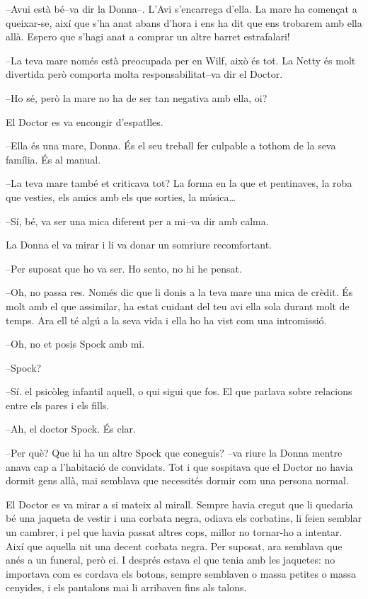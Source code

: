 --Avui està bé--va dir la Donna--. L'Avi s'encarrega d'ella. La mare ha
començat a queixar-se, així que s'ha anat abans d'hora i ens ha dit que
ens trobarem amb ella allà. Espero que s'hagi anat a comprar un altre
barret estrafalari!

--La teva mare només està preocupada per en Wilf, això és tot. La Netty
és molt divertida però comporta molta responsabilitat--va dir el Doctor.

--Ho sé, però la mare no ha de ser tan negativa amb ella, oi?

El Doctor es va encongir d'espatlles.

--Ella és una mare, Donna. És el seu treball fer culpable a tothom de la
seva família. És al manual.

--La teva mare també et criticava tot? La forma en la que et pentinaves,
la roba que vesties, els amics amb els que sorties, la música\ldots{}

--Sí, bé, va ser una mica diferent per a mi--va dir amb calma.

La Donna el va mirar i li va donar un somriure recomfortant.

--Per suposat que ho va ser. Ho sento, no hi he pensat.

--Oh, no passa res. Només dic que li donis a la teva mare una mica de
crèdit. És molt amb el que assimilar, ha estat cuidant del teu avi ella
sola durant molt de temps. Ara ell té algú a la seva vida i ella ho ha
vist com una intromissió.

--Oh, no et posis Spock amb mi.

--Spock?

--Sí. el psicòleg infantil aquell, o qui sigui que fos. El que parlava
sobre relacions entre els pares i els fills.

--Ah, el doctor Spock. És clar.

--Per què? Que hi ha un altre Spock que coneguis? --va riure la Donna
mentre anava cap a l'habitació de convidats. Tot i que sospitava que el
Doctor no havia dormit gens allà, mai semblava que necessités dormir com
una persona normal.

El Doctor es va mirar a si mateix al mirall. Sempre havia cregut que li
quedaria bé una jaqueta de vestir i una corbata negra, odiava els
corbatins, li feien semblar un cambrer, i pel que havia passat altres
cops, millor no tornar-ho a intentar. Així que aquella nit una decent
corbata negra. Per suposat, ara semblava que anés a un funeral, però ei.
I després estava el que tenia amb les jaquetes: no importava com es
cordava els botons, sempre semblaven o massa petites o massa cenyides, i
els pantalons mai li arribaven fins als talons.

